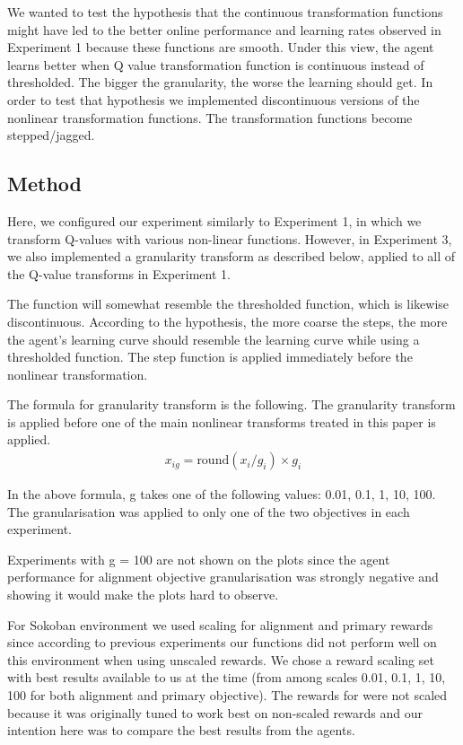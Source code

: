 

We wanted to test the hypothesis that the continuous transformation functions might have led to the better online performance and learning rates observed in Experiment 1 because these functions are smooth. Under this view, the agent learns better when Q value transformation function is continuous instead of thresholded. The bigger the granularity, the worse the learning should get. In order to test that hypothesis we implemented discontinuous versions of the nonlinear transformation functions. The transformation functions become stepped/jagged.

\subsection{Method}

Here, we configured our experiment similarly to Experiment 1, in which we transform Q-values with various non-linear functions. However, in Experiment 3, we also implemented a granularity transform as described below, applied to all of the Q-value transforms in Experiment 1.

The function will somewhat resemble the thresholded function, which is likewise discontinuous. According to the hypothesis, the more coarse the steps, the more the agent's learning curve should resemble the learning curve while using a thresholded function. The step function is applied immediately before the nonlinear transformation. 

The formula for granularity transform is the following. The granularity transform is applied before one of the main nonlinear transforms treated in this paper is applied.
\begin{align}
x_{ig} = \text{round}(x_i / g_i) \times g_i
\end{align}

In the above formula, g takes one of the following values: 0.01, 0.1, 1, 10, 100. The granularisation was applied to only one of the two objectives in each experiment. 

Experiments with g = 100 are not shown on the plots since the agent performance for alignment objective granularisation was strongly negative and showing it would make the plots hard to observe.

For Sokoban environment we used scaling for alignment and primary rewards since according to previous experiments our functions did not perform well on this environment when using unscaled rewards. We chose a reward scaling set with best results available to us at the time (from among scales 0.01, 0.1, 1, 10, 100 for both alignment and primary objective). The rewards for \tloA{} were not scaled because it was originally tuned to work best on non-scaled rewards and our intention here was to compare the best results from the agents.






